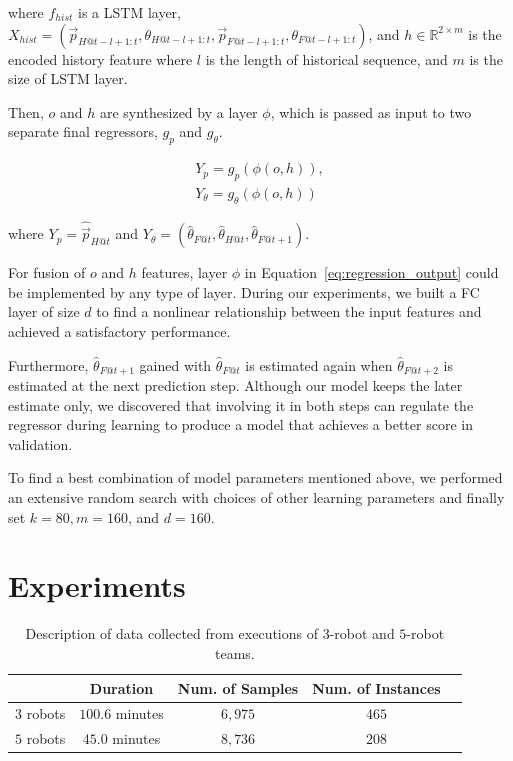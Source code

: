 \documentclass[letterpaper, 10 pt, conference]{ieeeconf}  %
\begin{document}
     where $f_{hist}$ is a LSTM layer,
		$X_{hist} = (\vec{p}_{H@t-l+1:t}, \theta_{H@t-l+1:t},
		             \vec{p}_{F@t-l+1:t}, \theta_{F@t-l+1:t})$,
		and $h \in \mathbb{R}^{2 \times m}$ is the encoded history feature
	where $l$ is the length of historical sequence,
	and $m$ is the size of LSTM layer.

	Then, $o$ and $h$ are synthesized by a layer $\phi$, which is
	passed as input to two separate final regressors, $g_{p}$ and $g_\theta$.

	\begin{equation}
	\begin{split}
	Y_{p} = g_{p}(\phi(o, h)),\\
	Y_{\theta}= g_{\theta}(\phi(o, h))
	\end{split}
	\label{eq:regression_output}
	\end{equation}

	where
	$Y_{p} = \hat{\vec{p}}_{H@t}$ and
	$Y_{\theta} = (\hat{\theta}_{F@t}, \hat{\theta}_{H@t}, \hat{\theta}_{F@t+1})$.

	For fusion of $o$ and $h$ features, layer $\phi$ in Equation~\ref{eq:regression_output}
	could be implemented by any type of layer. During our experiments, we
	built a FC layer of size $d$ to find a nonlinear relationship between the input
	features and achieved a satisfactory performance.

	Furthermore, $\hat{\theta}_{F@t+1}$ gained with $\hat{\theta}_{F@t}$ is
	estimated again when $\hat{\theta}_{F@t+2}$ is estimated at the next
	prediction step. Although our model keeps the later estimate only,
	we discovered that involving it in both steps can regulate the regressor
	during learning to produce a model that achieves a better score in validation.

	To find a best combination of model parameters mentioned above, we performed
	an extensive random search with choices of other learning parameters and
	finally set $k=80, m=160$, and $d=160$.


	\section{Experiments}
	\label{sec:experiments}

	\setlength{\tabcolsep}{0.5em} %
	{\renewcommand{\arraystretch}{1.2}%
		\begin{table}[t]
			\centering
			\begin{tabular}{|c|c|c|c|c|}
				\hline
							&  Duration & Num. of Samples & Num. of Instances  \\ \hline
				$3$ robots & $100.6$ minutes & $6,975$ & $465$  \\ \hline
				$5$ robots & $45.0$ minutes  & $8,736$ & $208$  \\ \hline
			\end{tabular}
			\caption{Description of data collected from executions of $3$-robot and $5$-robot teams.}
			\label{table:data_description}
		\end{table}
	}
\end{document}

